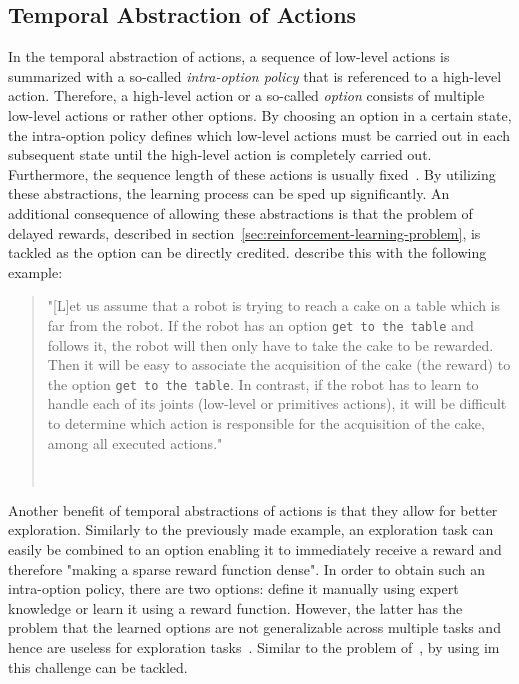 \documentclass[draft,final]{vutinfth} %
\newcommand{\p}[1]{see p. #1}
\begin{document}
    \subsection{Temporal Abstraction of Actions}\label{subsec:temporal-abstraction-of-actions}

    In the temporal abstraction of actions, a sequence of low-level actions is summarized with a so-called \textit{intra-option policy} that is referenced to a high-level action.
    Therefore, a high-level action or a so-called \textit{option} consists of multiple low-level actions or rather other options.
    By choosing an option in a certain state, the intra-option policy defines which low-level actions must be carried out in each subsequent state until the high-level action is completely carried out.
    Furthermore, the sequence length of these actions is usually fixed~\citep{aubret_survey_2019}.
    By utilizing these abstractions, the learning process can be sped up significantly.
    An additional consequence of allowing these abstractions is that the problem of delayed rewards, described in section~\ref{sec:reinforcement-learning-problem}, is tackled as the option can be directly credited.
    \citeauthor{aubret_survey_2019} describe this with the following example:

    \begin{quote}
        "[L]et us assume that a robot is trying to reach a cake on a table which is far from the robot.
        If the robot has an option \texttt{get to the table} and follows it, the robot will then only have to take the cake to be rewarded.
        Then it will be easy to associate the acquisition of the cake (the reward) to the option \texttt{get to the table}.
        In contrast, if the robot has to learn to handle each of its joints (low-level or primitives actions), it will be difficult to determine which action is responsible for the acquisition of the cake, among all executed actions."

        \hfill~\cite[\p{5f}]{aubret_survey_2019}
    \end{quote}

    Another benefit of temporal abstractions of actions is that they allow for better exploration.
    Similarly to the previously made example, an exploration task can easily be combined to an option enabling it to immediately receive a reward and therefore "making a sparse reward function dense".
    In order to obtain such an intra-option policy, there are two options: define it manually using expert knowledge or learn it using a reward function.
    However, the latter has the problem that the learned options are not generalizable across multiple tasks and hence are useless for exploration tasks~\citep{aubret_survey_2019}.
    Similar to the problem of~, by using \gls{im} this challenge can be tackled.
\end{document}
